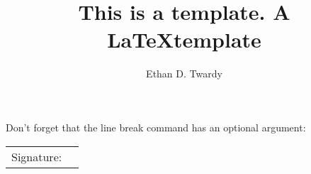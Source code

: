\documentclass[12pt]{article}
\title{This is a template. A \LaTeX template}
\author{Ethan D. Twardy}
\begin{document}
\doublespacing

\maketitle
\pagebreak

Don't forget that the line break command has an optional argument: \\[5pt]
\begin{tabular}{@{}p{2in}p{3in}@{}}
  Signature: & \hrulefill
\end{tabular}
\end{document}
